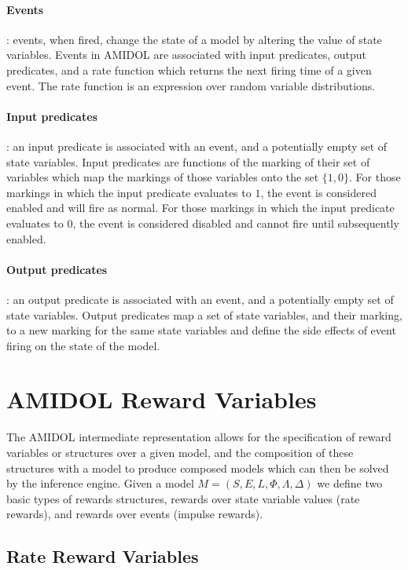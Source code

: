\documentclass[11pt]{article}
\newcommand{\amidol}{\textsc{AMIDOL}}
\begin{document}
\paragraph{Events}: events, when fired, change the state of a model by altering the value of state variables.  Events in \amidol{} are associated with input predicates, output predicates, and a rate function which returns the next firing time of a given event.  The rate function is an expression over random variable distributions.

\paragraph{Input predicates}: an input predicate is associated with an event, and a potentially empty set of state variables.  Input predicates are functions of the marking of their set of variables which map the markings of those variables onto the set $\{1, 0\}$.  For those markings in which the input predicate evaluates to $1$, the event is considered enabled and will fire as normal.  For those markings in which the input predicate evaluates to $0$, the event is considered disabled and cannot fire until subsequently enabled.

\paragraph{Output predicates}: an output predicate is associated with an event, and a potentially empty set of state variables.  Output predicates map a set of state variables, and their marking, to a new marking for the same state variables and define the side effects of event firing on the state of the model.

\section{\amidol{} Reward Variables}

The \amidol{} intermediate representation allows for the specification of reward variables or structures over a given model, and the composition of these structures with a model to produce composed models which can then be solved by the inference engine.  Given a model $M = (S, E, L, \Phi, \Lambda, \Delta)$ we define two basic types of rewards structures, rewards over state variable values (rate rewards), and rewards over events (impulse rewards). \cite{qureshi1996algorithms,deavours1999efficient,ciardo1996well,sanders1991reduced}

\subsection{Rate Reward Variables}
\end{document}
